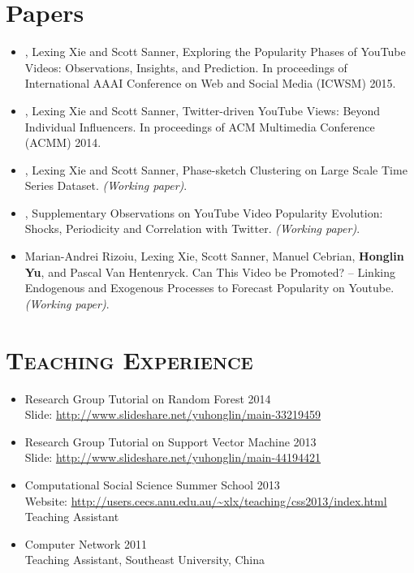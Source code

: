 \begin{resume}
\section{Papers}
\begin{itemize}
\item {, Lexing Xie and Scott Sanner}, Exploring the Popularity Phases of YouTube Videos: Observations, Insights, and Prediction. In proceedings of International AAAI Conference on Web and Social Media (ICWSM) 2015.
\item {, Lexing Xie and Scott Sanner}, Twitter-driven YouTube Views: Beyond Individual Influencers. In proceedings of ACM Multimedia Conference (ACMM) 2014.
\item {, Lexing Xie and Scott Sanner}, Phase-sketch Clustering on Large Scale Time Series Dataset. {\it (Working paper)}.
\item {}, Supplementary Observations on YouTube Video Popularity Evolution: Shocks, Periodicity and Correlation with Twitter. {\it (Working paper)}.
\item Marian-Andrei Rizoiu, Lexing Xie, Scott Sanner, Manuel Cebrian, {\bf Honglin Yu}, and Pascal Van Hentenryck. Can This Video be Promoted? -- Linking Endogenous and Exogenous Processes to Forecast Popularity on Youtube. {\it (Working paper)}.
\end{itemize} 



\section{\textsc{Teaching Experience}}
\begin{itemize}
\item Research Group Tutorial on Random Forest \hfill 2014 \\
  Slide: \url{http://www.slideshare.net/yuhonglin/main-33219459}
\item Research Group Tutorial on Support Vector Machine \hfill 2013 \\
  Slide: \url{http://www.slideshare.net/yuhonglin/main-44194421}  
\item Computational Social Science Summer School  \hfill 2013 \\
  Website: \url{http://users.cecs.anu.edu.au/~xlx/teaching/css2013/index.html} \\
    Teaching Assistant
  \item Computer Network \hfill 2011 \\
    Teaching Assistant, Southeast University, China
\end{itemize} 



\end{resume}
